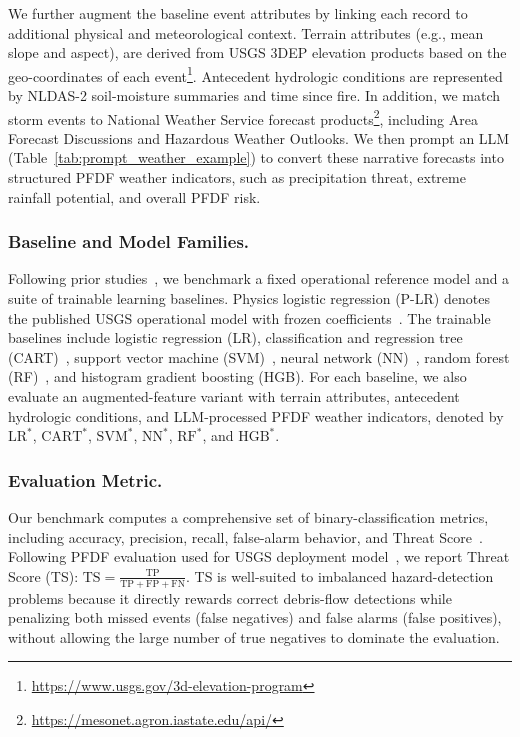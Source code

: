We further augment the baseline event attributes by linking each record to additional physical and meteorological context. Terrain attributes (e.g., mean slope and aspect), are derived from USGS 3DEP elevation products based on the geo-coordinates of each event\footnote{\url{https://www.usgs.gov/3d-elevation-program}}. Antecedent hydrologic conditions are represented by NLDAS-2 soil-moisture summaries and time since fire. In addition, we match storm events to National Weather Service forecast products\footnote{\url{https://mesonet.agron.iastate.edu/api/}}, including Area Forecast Discussions and Hazardous Weather Outlooks. We then prompt an LLM (Table~\ref{tab:prompt_weather_example}) to convert these narrative forecasts into structured PFDF weather indicators, such as precipitation threat, extreme rainfall potential, and overall PFDF risk.


\subsubsection{Baseline and Model Families.}\label{sec:baselines}
Following prior studies~\cite{staley2016, kern2017ml_pfdf, nikolopoulos2018pfdf_rf}, we benchmark a fixed operational reference model and a suite of trainable learning baselines. Physics logistic regression (P-LR) denotes the published USGS operational model with frozen coefficients~\cite{staley2016}. The trainable baselines include logistic regression (LR), classification and regression tree (CART)~\cite{kern2017ml_pfdf}, support vector machine (SVM)~\cite{kern2017ml_pfdf}, neural network (NN)~\cite{kern2017ml_pfdf}, random forest (RF)~\cite{nikolopoulos2018pfdf_rf}, and histogram gradient boosting (HGB). For each baseline, we also evaluate an augmented-feature variant with terrain attributes, antecedent hydrologic conditions, and LLM-processed PFDF weather indicators, denoted by $\mathrm{LR}^{*}$, $\mathrm{CART}^{*}$, $\mathrm{SVM}^{*}$, $\mathrm{NN}^{*}$, $\mathrm{RF}^{*}$, and $\mathrm{HGB}^{*}$.

\subsubsection{Evaluation Metric.} Our benchmark computes a comprehensive set of binary-classification metrics,
including accuracy, precision, recall, false-alarm behavior, and Threat Score~\cite{staley2016, kern2017ml_pfdf, nikolopoulos2018pfdf_rf}. Following PFDF evaluation used for USGS deployment model~\cite{staley2016}, we report Threat Score (TS): $\mathrm{TS}=\frac{\mathrm{TP}}{\mathrm{TP}+\mathrm{FP}+\mathrm{FN}}$. TS is well-suited to imbalanced hazard-detection problems because it directly
rewards correct debris-flow detections while penalizing both missed events (false negatives) and false alarms (false positives), without allowing the large number of true negatives to dominate the evaluation.


